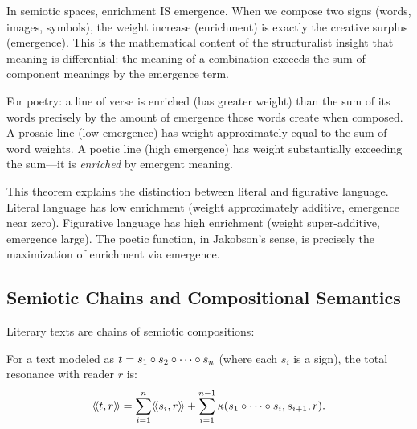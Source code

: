 \begin{interpretation}
In semiotic spaces, enrichment IS emergence. When we compose two signs (words,
images, symbols), the weight increase (enrichment) is exactly the creative
surplus (emergence). This is the mathematical content of the structuralist
insight that meaning is differential: the meaning of a combination exceeds the
sum of component meanings by the emergence term.

For poetry: a line of verse is enriched (has greater weight) than the sum of
its words precisely by the amount of emergence those words create when composed.
A prosaic line (low emergence) has weight approximately equal to the sum of
word weights. A poetic line (high emergence) has weight substantially exceeding
the sum---it is \emph{enriched} by emergent meaning.

This theorem explains the distinction between literal and figurative language.
Literal language has low enrichment (weight approximately additive, emergence
near zero). Figurative language has high enrichment (weight super-additive,
emergence large). The poetic function, in Jakobson's sense, is precisely the
maximization of enrichment via emergence.
\end{interpretation}



\subsection{Semiotic Chains and Compositional Semantics}

Literary texts are chains of semiotic compositions:

\begin{theorem}
\label{thm:semiotic-chain}
For a text modeled as $t = s_1 \circ s_2 \circ \cdots \circ s_n$
(where each $s_i$ is a sign), the total resonance with reader $r$ is:
\[
  \langle\!\langle t, r \rangle\!\rangle = \sum_{i=1}^n \langle\!\langle s_i, r \rangle\!\rangle
  + \sum_{i=1}^{n-1} \kappa(s_1 \circ \cdots \circ s_i, s_{i+1}, r).
\]
\end{theorem}

